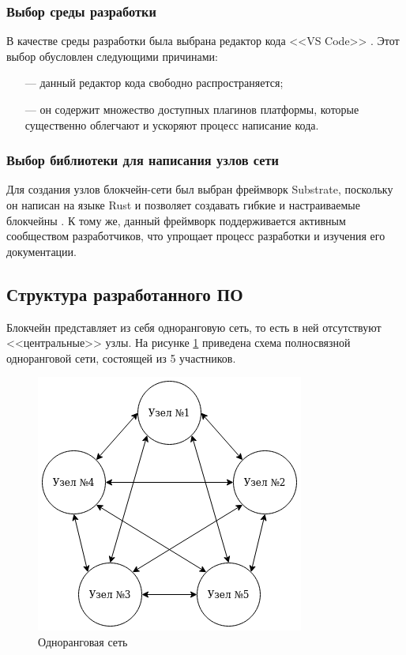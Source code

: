 \subsubsection{Выбор среды разработки}

В качестве среды разработки была выбрана редактор кода <<VS Code>> \cite{vscode}. Этот выбор обусловлен следующими причинами:
\begin{itemize}[leftmargin=1.6\parindent]
	\item[---] данный редактор кода свободно распространяется;
	\item[---] он содержит множество доступных плагинов платформы, которые существенно облегчают и ускоряют процесс написание кода.
\end{itemize}


\subsubsection{Выбор библиотеки для написания узлов сети}

Для создания узлов блокчейн-сети был выбран фреймворк Substrate, поскольку он написан на языке Rust и позволяет создавать гибкие и настраиваемые блокчейны \cite{substrate}. К тому же, данный фреймворк поддерживается активным сообществом разработчиков, что упрощает процесс разработки и изучения его документации.





\subsection{Структура разработанного ПО}

Блокчейн представляет из себя одноранговую сеть, то есть в ней отсутствуют <<центральные>> узлы. На рисунке \ref{fig:a8} приведена схема полносвязной одноранговой сети, состоящей из 5 участников.

\begin{figure}[hbtp]
	\centering
	\includegraphics{img/p2p.png}
	\caption{Одноранговая сеть}
	\label{fig:a8}
\end{figure}

